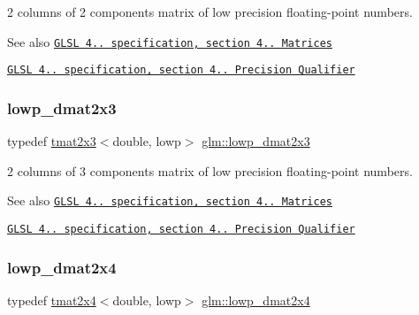 2 columns of 2 components matrix of low precision floating-\/point numbers.

\begin{DoxySeeAlso}{See also}
\href{http://www.opengl.org/registry/doc/GLSLangSpec.4.20.8.pdf}{\tt G\+L\+SL 4.. specification, section 4.. Matrices} 

\href{http://www.opengl.org/registry/doc/GLSLangSpec.4.20.8.pdf}{\tt G\+L\+SL 4.. specification, section 4.. Precision Qualifier} 
\end{DoxySeeAlso}
\mbox{\label{group__core__precision_gada78eb998a9c716aedee01501456b94d}} 
\subsubsection{\texorpdfstring{lowp\+\_\+dmat2x3}{lowp\_dmat2x3}}
{\footnotesize\ttfamily typedef \hyperlink{structglm_1_1tmat2x3}{tmat2x3}$<$double, lowp$>$ \hyperlink{group__core__precision_gada78eb998a9c716aedee01501456b94d}{glm\+::lowp\+\_\+dmat2x3}}

2 columns of 3 components matrix of low precision floating-\/point numbers.

\begin{DoxySeeAlso}{See also}
\href{http://www.opengl.org/registry/doc/GLSLangSpec.4.20.8.pdf}{\tt G\+L\+SL 4.. specification, section 4.. Matrices} 

\href{http://www.opengl.org/registry/doc/GLSLangSpec.4.20.8.pdf}{\tt G\+L\+SL 4.. specification, section 4.. Precision Qualifier} 
\end{DoxySeeAlso}
\mbox{\label{group__core__precision_ga2aee5f52e32f0adcfdeb3142b50cb660}} 
\subsubsection{\texorpdfstring{lowp\+\_\+dmat2x4}{lowp\_dmat2x4}}
{\footnotesize\ttfamily typedef \hyperlink{structglm_1_1tmat2x4}{tmat2x4}$<$double, lowp$>$ \hyperlink{group__core__precision_ga2aee5f52e32f0adcfdeb3142b50cb660}{glm\+::lowp\+\_\+dmat2x4}}

